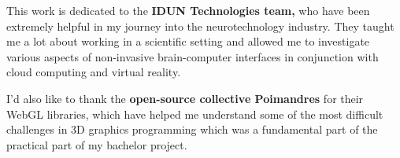\begin{dedication}

  This work is dedicated to the \textbf{IDUN Technologies team,} who have been extremely helpful in my journey into the neurotechnology industry. They taught me a lot about working in a scientific setting and allowed me to investigate various aspects of non-invasive brain-computer interfaces in conjunction with cloud computing and virtual reality.

  \hfill \break

  I'd also like to thank the \textbf{open-source collective Poimandres} for their WebGL libraries, which have helped me understand some of the most difficult challenges in 3D graphics programming which was a fundamental part of the practical part of my bachelor project.

\end{dedication}
